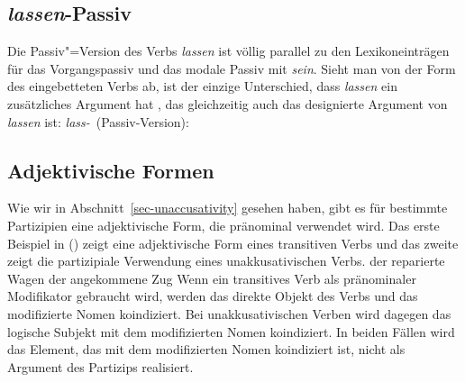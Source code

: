 {\subsection{\emph{lassen}-Passiv}
\label{lassen-passive-da}


Die Passiv"=Version des Verbs \emph{lassen} ist völlig parallel
zu den Lexikoneinträgen für das Vorgangspassiv 
und das modale Passiv mit \emph{sein}. Sieht man von der Form des eingebetteten Verbs ab, ist der
einzige Unterschied, dass \emph{lassen} ein zusätzliches Argument hat ,
das gleichzeitig auch das designierte Argument von \emph{lassen} ist:
\eas
\label{le-lassen-passive-da}%
\mbox{\emph{lass-} (Passiv-Version):} \\
\ms{
 head$|$da     & \sliste{ \ibox{1} }\\
 arg-st & \sliste{ \ibox{1} NP[\type{str}] } $\oplus$ \ibox{2} $\oplus$ \liste{ V[\type{bse}, \textsc{lex}+, \textsc{da}~\sliste{ NP\sub{\type{ref}}}, \textsc{comps}~\ibox{2}]}
}
\zs




\subsection{Adjektivische Formen}
\label{sec-adj-formation}


Wie wir in Abschnitt~\ref{sec-unaccusativity} gesehen haben, gibt
es für bestimmte Partizipien eine adjektivische Form, die
pränominal verwendet wird. Das erste Beispiel in () zeigt eine
adjektivische Form eines transitiven Verbs und das zweite
zeigt die partizipiale Verwendung eines unakkusativischen Verbs.
\eal
\ex{}\label{ex-der-reparierte-wagen}
der reparierte Wagen
\ex{}\label{ex-angekommene}
der angekommene Zug
\zl
Wenn ein transitives Verb als pränominaler Modifikator gebraucht wird,
werden das direkte Objekt des Verbs und das modifizierte Nomen koindiziert.
Bei unakkusativischen Verben wird dagegen das logische Subjekt mit dem modifizierten Nomen koindiziert.
In beiden Fällen wird das Element, das mit dem modifizierten Nomen koindiziert ist,
nicht als Argument des Partizips realisiert.

}
